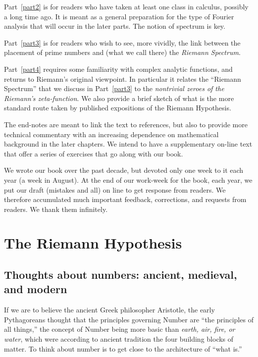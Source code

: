 \documentclass[openany]{book}
\theoremstyle{plain}
\theoremstyle{definition}
\newcommand{\RH}{Riemann Hypothesis\index{Riemann Hypothesis}}
\begin{document}
    Part~\ref{part2} is for readers who have taken at least one class in calculus, possibly a long time ago.  It is meant as a general preparation for the type of Fourier analysis that will occur in the later parts. The notion of spectrum is key.

    Part~\ref{part3} is for readers who wish to see, more vividly, the link between the placement of prime numbers and (what we call there) the {\it Riemann Spectrum}.

    Part~\ref{part4} requires some familiarity with complex analytic functions, and returns to Riemann's original viewpoint.  In particular it  relates the ``Riemann Spectrum'' that we discuss in Part~\ref{part3} to the {\it nontrivial zeroes of the Riemann's zeta-function}. We also provide a brief sketch of what is the more standard route taken by published expositions of the Riemann Hypothesis.

      The end-notes are meant to link the text to references, but also to provide  more technical commentary with an increasing dependence on mathematical background in the later chapters.  We intend to have a supplementary on-line text that offer a series of exercises that go along with our book.

      We wrote our book over the past decade, but devoted only one week to it each year (a week in August).    At the end of our work-week for the book, each year, we put our draft (mistakes and all) on line to get response from readers. We therefore accumulated much important feedback, corrections, and requests from readers. We thank them infinitely.


\part{The \RH{}\label{part1}}


\chapter[Thoughts about numbers]{Thoughts about numbers: ancient, medieval, and modern}

If we are to believe the ancient Greek philosopher Aristotle, the early
Pythagoreans thought that the principles governing Number are ``the
principles of all things,'' the concept of Number being more basic than
{\em earth, air, fire, or water}, which were according to ancient tradition
the four building blocks of matter. To think about number is to get
close to the architecture of ``what is.''
\end{document}
